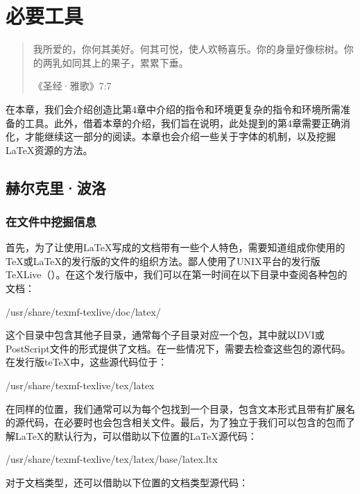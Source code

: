 \chapter{必要工具}

\begin{quote}
    我所爱的，你何其美好。何其可悦，使人欢畅喜乐。你的身量好像棕树。你的两乳如同其上的果子，累累下垂。

    \hfill《圣经·雅歌》7:7
\end{quote}

在本章，我们会介绍创造比第4章中介绍的指令和环境更复杂的指令和环境所需准备的工具。此外，借着本章的介绍，我们旨在说明，此处提到的第4章需要正确消化，才能继续这一部分的阅读。本章也会介绍一些关于字体的机制，以及挖掘\LaTeX 资源的方法。

\section{赫尔克里·波洛}

\subsection{在文件中挖掘信息}

首先，为了让使用\LaTeX 写成的文档带有一些个人特色，需要知道组成你使用的\TeX 或\LaTeX 的发行版的文件的组织方法。鄙人使用了UNIX平台的发行版\TeX Live（）。在这个发行版中，我们可以在第一时间在以下目录中查阅各种包的文档：

\begin{dmd}
/usr/share/texmf-texlive/doc/latex/
\end{dmd}

这个目录中包含其他子目录，通常每个子目录对应一个包，其中就以DVI或PostScript文件的形式提供了文档。在一些情况下，需要去检查这些包的源代码。在发行版te\TeX 中，这些源代码位于：

\begin{dmd}
/usr/share/texmf-texlive/tex/latex
\end{dmd}

在同样的位置，我们通常可以为每个包找到一个目录，包含文本形式且带有扩展名的源代码，在必要时也会包含相关文件。最后，为了独立于我们可以包含的包而了解\LaTeX 的默认行为，可以借助以下位置的\LaTeX 源代码：

\begin{dmd}
/usr/share/texmf-texlive/tex/latex/base/latex.ltx
\end{dmd}

对于文档类型，还可以借助以下位置的文档类型源代码：

